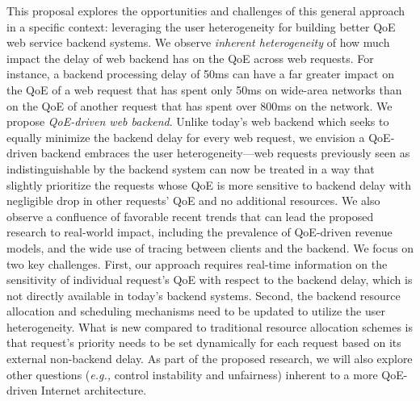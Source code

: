 \documentclass{proposalnsf}
\newcommand{\eg}{{\it e.g.,}\xspace}
\begin{document}
This proposal explores the opportunities and challenges of this general approach in a specific context: leveraging the user heterogeneity for building better QoE web service backend systems.
We observe {\em inherent heterogeneity} of how much impact the delay of web backend has on the QoE across web requests.
For instance, a backend processing delay of 50ms can have a far greater impact on the QoE of a web request that has spent only 50ms on wide-area networks than on the QoE of another request that has spent over 800ms on the network.
We propose {\em QoE-driven web backend}.
Unlike today's web backend which seeks to equally minimize the backend delay for every web request, we envision a QoE-driven backend embraces the user heterogeneity---web requests previously seen as indistinguishable by the backend system can now be treated in a way that slightly prioritize the requests whose QoE is more sensitive to backend delay with negligible drop in other requests' QoE and no additional resources.
We also observe a confluence of favorable recent trends that can lead the proposed research to real-world impact, including the prevalence of QoE-driven revenue models, and the wide use of tracing between clients and the backend.
We focus on two key challenges.
First, our approach requires real-time information on the sensitivity of individual request's QoE with respect to the backend delay, which is not directly available in today's backend systems.
Second, the backend resource allocation and scheduling mechanisms need to be updated to utilize the user heterogeneity. What is new compared to traditional resource allocation schemes is that request's priority needs to be set dynamically for each request based on its external non-backend delay.
As part of the proposed research, we will also explore other questions (\eg control instability and unfairness) inherent to a more QoE-driven Internet architecture.
\end{document}
